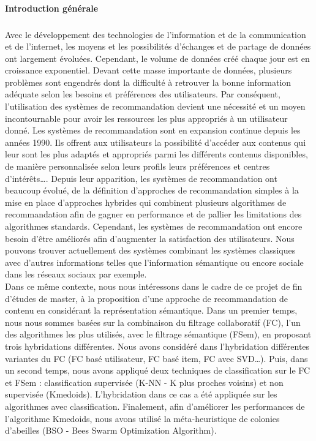 \begin{center}
	\textbf{\LARGE Introduction générale}
\end{center}
\subsubsection*{}
Avec le développement des technologies de l’information et de la communication et de l’internet, les moyens et les possibilités d’échanges et de partage de données ont largement évoluées. Cependant, le volume de données créé chaque jour est en croissance exponentiel. Devant cette masse importante de données, plusieurs problèmes sont engendrés dont la difficulté à retrouver la bonne information adéquate selon les besoins et préférences des utilisateurs. Par conséquent, l’utilisation des systèmes de recommandation devient une nécessité et un moyen incontournable pour avoir les ressources les plus appropriés à un utilisateur donné. Les systèmes de recommandation sont en expansion continue depuis les années 1990. Ils offrent aux utilisateurs la possibilité d’accéder aux contenus qui leur sont les plus adaptés et appropriés parmi les différents contenus disponibles, de manière personnalisée selon leurs profils leurs préférences et centres d’intérêts…. Depuis leur apparition, les systèmes de recommandation ont beaucoup évolué, de la définition d’approches de recommandation simples à la mise en place d’approches hybrides qui combinent plusieurs algorithmes de recommandation afin de gagner en performance et de pallier les limitations des algorithmes standards. Cependant, les systèmes de recommandation ont encore besoin d’être améliorés afin d’augmenter la satisfaction des utilisateurs. Nous pouvons trouver actuellement des systèmes combinant les systèmes classiques avec d’autres informations telles que l’information sémantique ou encore sociale dans les réseaux sociaux par exemple.\\

Dans ce même contexte, nous nous intéressons dans le cadre de ce projet de fin d’études de master, à la proposition d’une approche de recommandation de contenu en considérant la représentation sémantique. Dans un premier temps, nous nous sommes basées sur la combinaison du filtrage collaboratif (FC), l’un des algorithmes les plus utilisés, avec le filtrage sémantique (FSem), en proposant trois hybridations différentes. Nous avons considéré dans l’hybridation différentes variantes du FC (FC basé utilisateur, FC basé item, FC avec SVD…). Puis, dans un second temps, nous avons appliqué deux techniques de classification sur le FC et FSem : classification supervisée (K-NN - K plus proches voisins) et non supervisée (Kmedoids). L’hybridation dans ce cas a été appliquée sur les algorithmes avec classification. Finalement, afin d’améliorer les performances de l’algorithme Kmedoids, nous avons utilisé la méta-heuristique de colonies d’abeilles (BSO - Bees Swarm Optimization Algorithm).\\

